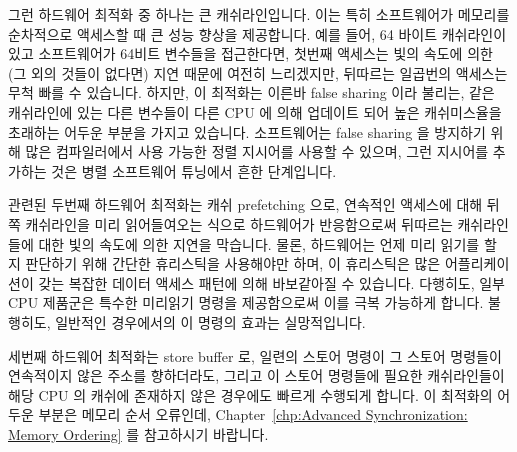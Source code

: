 그런 하드웨어 최적화 중 하나는 큰 캐쉬라인입니다.
이는 특히 소프트웨어가 메모리를 순차적으로 액세스할 때 큰 성능 향상을
제공합니다.
예를 들어, 64 바이트 캐쉬라인이 있고 소프트웨어가 64비트 변수들을 접근한다면,
첫번째 액세스는 빛의 속도에 의한 (그 외의 것들이 없다면) 지연 때문에 여전히
느리겠지만, 뒤따르는 일곱번의 액세스는 무척 빠를 수 있습니다.
하지만, 이 최적화는 이른바 false sharing 이라 불리는, 같은 캐쉬라인에 있는 다른
변수들이 다른 CPU 에 의해 업데이트 되어 높은 캐쉬미스율을 초래하는 어두운
부분을 가지고 있습니다.
소프트웨어는 false sharing 을 방지하기 위해 많은 컴파일러에서 사용 가능한 정렬
지시어를 사용할 수 있으며, 그런 지시어를 추가하는 것은 병렬 소프트웨어 튜닝에서
흔한 단계입니다.

관련된 두번째 하드웨어 최적화는 캐쉬 prefetching 으로, 연속적인 액세스에 대해
뒤쪽 캐쉬라인을 미리 읽어들여오는 식으로 하드웨어가 반응함으로써 뒤따르는
캐쉬라인들에 대한 빛의 속도에 의한 지연을 막습니다.
물론, 하드웨어는 언제 미리 읽기를 할 지 판단하기 위해 간단한 휴리스틱을
사용해야만 하며, 이 휴리스틱은 많은 어플리케이션이 갖는 복잡한 데이터 액세스
패턴에 의해 바보같아질 수 있습니다.
다행히도, 일부 CPU 제품군은 특수한 미리읽기 명령을 제공함으로써 이를 극복
가능하게 합니다.
불행히도, 일반적인 경우에서의 이 명령의 효과는 실망적입니다.

세번째 하드웨어 최적화는 store buffer 로, 일련의 스토어 명령이 그 스토어
명령들이 연속적이지 않은 주소를 향하더라도, 그리고 이 스토어 명령들에 필요한
캐쉬라인들이 해당 CPU 의 캐쉬에 존재하지 않은 경우에도 빠르게 수행되게 합니다.
이 최적화의 어두운 부분은 메모리 순서 오류인데,
Chapter~\ref{chp:Advanced Synchronization: Memory Ordering}
를 참고하시기 바랍니다.

